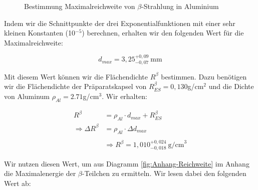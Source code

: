 \documentclass{article}
\begin{document}
\begin{figure}[!h]
    \centering
    \caption{Bestimmung Maximalreichweite von $\beta$-Strahlung in Aluminium}
    \label{fig:A3-Reichweite}
\end{figure}

Indem wir die Schnittpunkte der drei Exponentialfunktionen mit einer sehr kleinen Konstanten (10$^{-5}$) berechnen, erhalten wir den folgenden Wert für die Maximalreichweite:  

\begin{equation}
    d_{max} = 3,25 ^{+0,09} _{-0,07} \ \text{mm}
\end{equation}

Mit diesem Wert können wir die Flächendichte $R^\beta$ bestimmen. Dazu benötigen wir die Flächendichte der Präparatskapsel von $R^\beta _{ES} = 0,130$g/cm$^2$ und die Dichte von Aluminum $\rho_{Al} = 2.71$g/cm$^3$. Wir erhalten:

\begin{equation}
    \begin{split}
        R^\beta &= \rho_{Al} \cdot d_{max} + R^\beta _{ES} \\
        \Rightarrow \Delta R^\beta &= \rho_{Al} \cdot \Delta d_{max} \\ \\
        &\Rightarrow R^\beta = 1,010 ^{+0,024} _{-0,018} \ \text{g/cm}^3
    \end{split}
\end{equation}

Wir nutzen diesen Wert, um aus Diagramm \ref{fig:Anhang-Reichweite} im Anhang die Maximalenergie der $\beta$-Teilchen zu ermitteln. Wir lesen dabei den folgenden Wert ab:
\end{document}
